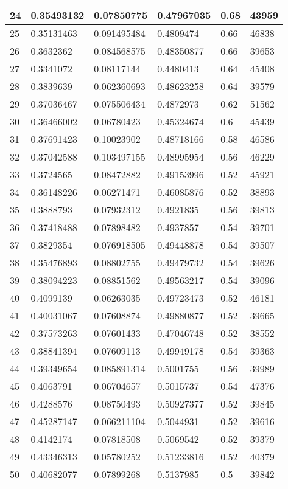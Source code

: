 \begin{longtable}{|l|l|l|l|l|l|}
24 & 0.35493132 & 0.07850775 & 0.47967035 & 0.68 & 43959 \\ \hline 
25 & 0.35131463 & 0.091495484 & 0.4809474 & 0.66 & 46838 \\ \hline 
26 & 0.3632362 & 0.084568575 & 0.48350877 & 0.66 & 39653 \\ \hline 
27 & 0.3341072 & 0.08117144 & 0.4480413 & 0.64 & 45408 \\ \hline 
28 & 0.3839639 & 0.062360693 & 0.48623258 & 0.64 & 39579 \\ \hline 
29 & 0.37036467 & 0.075506434 & 0.4872973 & 0.62 & 51562 \\ \hline 
30 & 0.36466002 & 0.06780423 & 0.45324674 & 0.6 & 45439 \\ \hline 
31 & 0.37691423 & 0.10023902 & 0.48718166 & 0.58 & 46586 \\ \hline 
32 & 0.37042588 & 0.103497155 & 0.48995954 & 0.56 & 46229 \\ \hline 
33 & 0.3724565 & 0.08472882 & 0.49153996 & 0.52 & 45921 \\ \hline 
34 & 0.36148226 & 0.06271471 & 0.46085876 & 0.52 & 38893 \\ \hline 
35 & 0.3888793 & 0.07932312 & 0.4921835 & 0.56 & 39813 \\ \hline 
36 & 0.37418488 & 0.07898482 & 0.4937857 & 0.54 & 39701 \\ \hline 
37 & 0.3829354 & 0.076918505 & 0.49448878 & 0.54 & 39507 \\ \hline 
38 & 0.35476893 & 0.08802755 & 0.49479732 & 0.54 & 39626 \\ \hline 
39 & 0.38094223 & 0.08851562 & 0.49563217 & 0.54 & 39096 \\ \hline 
40 & 0.4099139 & 0.06263035 & 0.49723473 & 0.52 & 46181 \\ \hline 
41 & 0.40031067 & 0.07608874 & 0.49880877 & 0.52 & 39665 \\ \hline 
42 & 0.37573263 & 0.07601433 & 0.47046748 & 0.52 & 38552 \\ \hline 
43 & 0.38841394 & 0.07609113 & 0.49949178 & 0.54 & 39363 \\ \hline 
44 & 0.39349654 & 0.085891314 & 0.5001755 & 0.56 & 39989 \\ \hline 
45 & 0.4063791 & 0.06704657 & 0.5015737 & 0.54 & 47376 \\ \hline 
46 & 0.4288576 & 0.08750493 & 0.50927377 & 0.52 & 39845 \\ \hline 
47 & 0.45287147 & 0.066211104 & 0.5044931 & 0.52 & 39616 \\ \hline 
48 & 0.4142174 & 0.07818508 & 0.5069542 & 0.52 & 39379 \\ \hline 
49 & 0.43346313 & 0.05780252 & 0.51233816 & 0.52 & 40379 \\ \hline 
50 & 0.40682077 & 0.07899268 & 0.5137985 & 0.5 & 39842 \\ \hline 
\end{longtable}